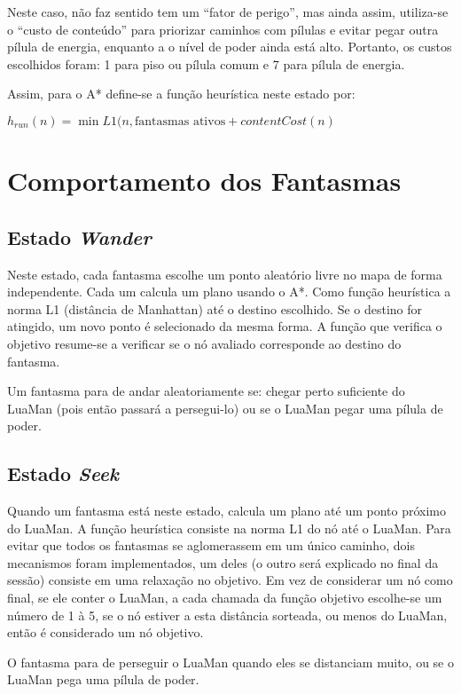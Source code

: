 \documentclass[a4paper]{scrartcl}
\begin{document}
Neste caso, não faz sentido tem um ``fator de perigo'', mas ainda assim, utiliza-se o ``custo de conteúdo'' para priorizar caminhos com pílulas e evitar pegar outra pílula de energia, enquanto a
o nível de poder ainda está alto. Portanto, os custos escolhidos foram: 1 para piso ou pílula comum e 7 para pílula de energia.

Assim, para o A* define-se a função heurística neste estado por:

$h_{run}(n) = \min{L1(n, \text{fantasmas ativos}} + contentCost(n)$

\section{Comportamento dos Fantasmas}

\subsection{Estado \textit{Wander}}

Neste estado, cada fantasma escolhe um ponto aleatório livre no mapa de forma independente.
Cada um calcula um plano usando o A*. Como função heurística a norma L1 (distância de Manhattan)
até o destino escolhido. Se o destino for atingido, um novo ponto é selecionado da mesma forma.
A função que verifica o objetivo resume-se a verificar se o nó avaliado corresponde ao destino do
fantasma.

Um fantasma para de andar aleatoriamente se: chegar perto suficiente do LuaMan
(pois então passará a persegui-lo) ou se o LuaMan pegar uma pílula de poder.

\subsection{Estado \textit{Seek}}

Quando um fantasma está neste estado, calcula um plano até um ponto próximo do LuaMan.
A função heurística consiste na norma L1 do nó até o LuaMan. Para evitar que todos os fantasmas
se aglomerassem em um único caminho, dois mecanismos foram implementados, um deles (o outro será explicado no final da sessão) consiste em uma
relaxação no objetivo. Em vez de considerar um nó como final, se ele conter o LuaMan, a cada chamada
da função objetivo escolhe-se um número de 1 à 5, se o nó estiver a esta distância sorteada, ou menos
do LuaMan, então é considerado um nó objetivo.

O fantasma para de perseguir o LuaMan quando eles se distanciam muito, ou se o LuaMan pega uma pílula de poder.
\end{document}

